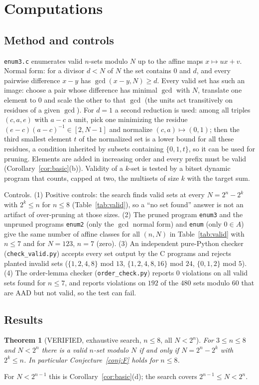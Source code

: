 \documentclass[11pt]{article}
\newtheorem{theorem}{Theorem}
\theoremstyle{definition}
\begin{document}
\section{Computations}\label{sec:comp}
\subsection{Method and controls}
\texttt{enum3.c} enumerates valid $n$-sets modulo $N$ up to the affine maps $x\mapsto ux+v$. Normal form: for a divisor $d<N$ of $N$ the set contains $0$ and $d$, and every pairwise difference $x-y$ has $\gcd(x-y,N)\ge d$. Every valid set has such an image: choose a pair whose difference has minimal $\gcd$ with $N$, translate one element to $0$ and scale the other to that $\gcd$ (the units act transitively on residues of a given $\gcd$). For $d=1$ a second reduction is used: among all triples $(c,a,e)$ with $a-c$ a unit, pick one minimizing the residue $(e-c)(a-c)^{-1}\in[2,N-1]$ and normalize $(c,a)\mapsto(0,1)$; then the third smallest element $t$ of the normalized set is a lower bound for all these residues, a condition inherited by subsets containing $\{0,1,t\}$, so it can be used for pruning. Elements are added in increasing order and every prefix must be valid (Corollary~\ref{cor:basic}(b)). Validity of a $k$-set is tested by a bitset dynamic program that counts, capped at two, the multisets of size $k$ with the target sum.

Controls. (1) Positive controls: the search finds valid sets at every $N=2^n-2^k$ with $2^k\le n$ for $n\le 8$ (Table~\ref{tab:valid}), so a ``no set found'' answer is not an artifact of over-pruning at those sizes. (2) The pruned program \texttt{enum3} and the unpruned programs \texttt{enum2} (only the $\gcd$ normal form) and \texttt{enum} (only $0\in A$) give the same number of affine classes for all $(n,N)$ in Table~\ref{tab:valid} with $n\le7$ and for $N=123$, $n=7$ (zero). (3) An independent pure-Python checker (\texttt{check\_valid.py}) accepts every set output by the C programs and rejects planted invalid sets ($\{1,2,4,8\}$ mod $13$, $\{1,2,4,8,16\}$ mod $24$, $\{0,1,2\}$ mod $5$). (4) The order-lemma checker (\texttt{order\_check.py}) reports $0$ violations on all valid sets found for $n\le7$, and reports violations on $192$ of the $480$ sets modulo $60$ that are AAD but not valid, so the test can fail.

\subsection{Results}
\begin{theorem}[VERIFIED, exhaustive search, $n\le 8$, all $N<2^n$]\label{thm:n8}
For $3\le n\le 8$ and $N<2^n$ there is a valid $n$-set modulo $N$ if and only if $N=2^n-2^k$ with $2^k\le n$. In particular Conjecture~\ref{conj:F} holds for $n\le 8$.
\end{theorem}
\noindent For $N<2^{n-1}$ this is Corollary~\ref{cor:basic}(d); the search covers $2^{n-1}\le N<2^n$.
\end{document}
